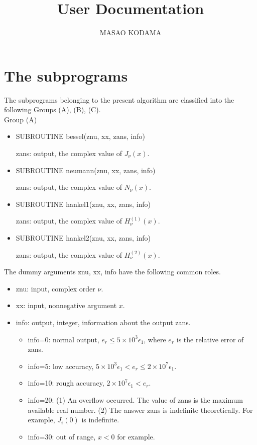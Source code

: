 \documentclass[acmtoms]{acmtrans2m}
\title{User Documentation}
\author{MASAO KODAMA}
\begin{document}
\maketitle
\section{The subprograms}
The subprograms belonging to the present algorithm are classified into 
the following Groups (A), (B), (C).\\
%
Group (A)
\begin{itemize}
\item SUBROUTINE bessel(znu, xx, zans, info)

zans: output, the complex value of $J_\nu(x)$.
\item SUBROUTINE neumann(znu, xx, zans, info)

zans: output, the complex value of $N_\nu(x)$.
\item SUBROUTINE hankel1(znu, xx, zans, info)

zans: output, the complex value of $H_\nu^{(1)}\!(x)$.
\item SUBROUTINE hankel2(znu, xx, zans, info)

zans: output, the complex value of $H_\nu^{(2)}\!(x)$.
\end{itemize}
The dummy arguments znu, xx, info have the following common roles.
\begin{itemize}
\item znu: input, complex order $\nu$.
\item xx: input, nonnegative argument $x$.
\item info: output, integer, information about the output zans.
\begin{itemize}
\item info=0:  normal output, $e_r\le5\!\times\! 10^3\epsilon_1$, where
$e_r$ is the relative error of zans.
\item info=5:  low accuracy, 
$5\!\times\! 10^3\epsilon_1 <e_r \le 2\!\times\! 10^7\epsilon_1$.
\item info=10: rough accuracy, $2\!\times\! 10^7\epsilon_1<e_r$.
\item info=20: (1) An overflow occurred. The value of zans
is the maximum available real number. (2) The answer zans is 
indefinite theoretically. For example, $J_{i}(0)$ is indefinite.
\item info=30:  out of range, $x<0$ for example.
\end{itemize}
\end{itemize}
%
\end{document}
